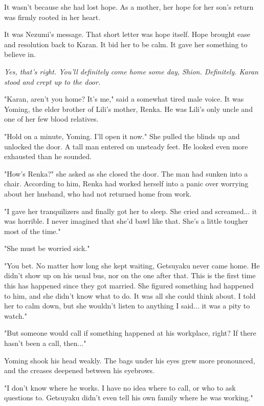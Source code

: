 It wasn't because she had lost hope. As a mother, her hope for her son's
return was firmly rooted in her heart.


It was Nezumi's message. That short letter was hope itself. Hope brought
ease and resolution back to Karan. It bid her to be calm. It gave her
something to believe in.


\emph{Yes, that's right. You'll definitely come home some day, Shion.
	Definitely. Karan stood and crept up to the door.}

"Karan, aren't you home? It's me," said a somewhat tired male voice. It
was Yoming, the elder brother of Lili's mother, Renka. He was Lili's
only uncle and one of her few blood relatives.

"Hold on a minute, Yoming. I'll open it now." She pulled the blinds up
and unlocked the door. A tall man entered on unsteady feet. He looked
even more exhausted than he sounded.

"How's Renka?" she asked as she closed the door. The man had sunken into
a chair. According to him, Renka had worked herself into a panic over
worrying about her husband, who had not returned home from work.

"I gave her tranquilizers and finally got her to sleep. She cried and
screamed... it was horrible. I never imagined that she'd bawl like that.
She's a little tougher most of the time."

"She must be worried sick."

"You bet. No matter how long she kept waiting, Getsuyaku never came
home. He didn't show up on his usual bus, nor on the one after that.
This is the first time this has happened since they got married. She
figured something had happened to him, and she didn't know what to do.
It was all she could think about. I told her to calm down, but she
wouldn't listen to anything I said... it was a pity to watch."

"But someone would call if something happened at his workplace, right?
If there hasn't been a call, then..."

Yoming shook his head weakly. The bags under his eyes grew more
pronounced, and the creases deepened between his eyebrows.

"I don't know where he works. I have no idea where to call, or who to
ask questions to. Getsuyaku didn't even tell his own family where he was
working."


